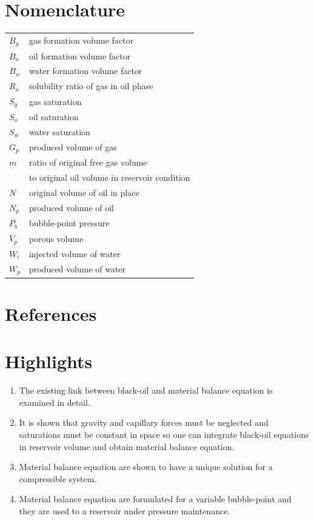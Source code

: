 \documentclass[authoryear,preprint,review,11pt]{elsarticle}
\begin{document}
\section*{Nomenclature}
\begin{tabular}{ll}
$B_g$ & gas formation volume factor\\
$B_o$ & oil formation volume factor\\
$B_w$ & water formation volume factor\\
$R_s$ & solubility ratio of gas in oil phase\\
$S_g$ & gas saturation \\
$S_o$ & oil saturation \\
$S_w$ & water saturation \\
$G_p$ & produced volume of gas \\
$m$ & ratio of original free gas volume \\
& to original oil volume in reservoir condition \\
$N$ & original volume of oil in place \\
$N_p$ & produced volume of oil \\
$P_b$ & bubble-point pressure \\
$V_p$ & porous volume \\
$W_i$ & injected volume of water \\
$W_p$ & produced volume of water
\end{tabular}
\section*{References}


\cite{*}

\section*{Highlights}
\begin{enumerate}[1.]
\item The existing link between black-oil and material balance equation is examined in detail.
\item It is shown that gravity and capillary forces must be neglected and saturations must be constant in space so one can integrate black-oil equations in reservoir volume and obtain material balance equation.
\item Material balance equation are shown to have a unique solution for a compressible system.
\item Material balance equation are formulated for a variable bubble-point and they are used to a reservoir under pressure maintenance.
\end{enumerate}
\end{document}
